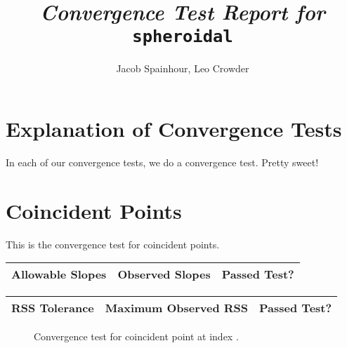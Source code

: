 \documentclass[12pt]{article}
\begin{document}
\title{{\small{\it Convergence Test Report for}}  \\ \texttt{spheroidal}}

\author{Jacob Spainhour, Leo Crowder}

\maketitle

\section*{Explanation of Convergence Tests}

In each of our convergence tests, we do a convergence test. Pretty sweet!

\pagebreak

\section*{Coincident Points}
This is the convergence test for coincident points.

\begin{center}
\def\arraystretch{1.5}
\begin{tabular}{|c|c|c|}
    \hline
    Allowable Slopes & Observed Slopes & Passed Test?\\
    \hline
    
    \hline
\end{tabular}
\end{center}

\begin{center}
\def\arraystretch{1.5}
\begin{tabular}{|c|c|c|}
    \hline
    RSS Tolerance & Maximum Observed RSS & Passed Test?\\
    \hline
    
    \hline
\end{tabular}
\end{center}

\begin{figure}[!ht]
    \centering
    \caption{Convergence test for coincident point at index \protect.}
\end{figure}
\end{document}
